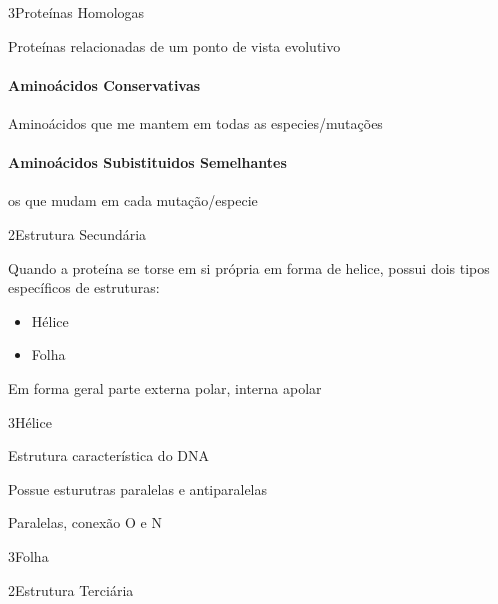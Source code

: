 \documentclass[\mainfilename]{subfiles}
\begin{document}
\begin{sectionBox}3{Proteínas Homologas}
    
    Proteínas relacionadas de um ponto de vista evolutivo

    \paragraph{Aminoácidos Conservativas} Aminoácidos que me mantem em todas as especies/mutações

    \paragraph{Aminoácidos Subistituidos Semelhantes} os que mudam em cada mutação/especie
    
\end{sectionBox}

\begin{sectionBox}2{Estrutura Secundária}
    
    Quando a proteína se torse em si própria em forma de helice, possui dois tipos específicos de estruturas:

    \begin{itemize}
        \item Hélice \chemalpha
        \item Folha  \chembeta
    \end{itemize}

    Em forma geral parte externa polar, interna apolar
    
\end{sectionBox}

\begin{sectionBox}3{Hélice \chemalpha}
    
    Estrutura característica do DNA

    Possue esturutras paralelas e antiparalelas

    Paralelas, conexão O e N
    
\end{sectionBox}

\begin{sectionBox}3{Folha \chembeta}
    
    
    
\end{sectionBox}

\begin{sectionBox}2{Estrutura Terciária}
    
    
    
\end{sectionBox}
\end{document}
